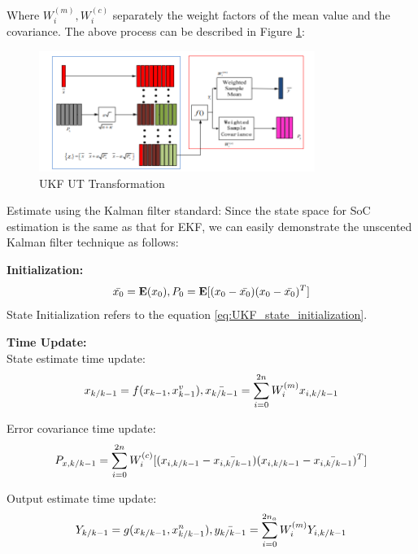 Where $W_i^{(m)}, W_i^{(c)}$ separately the weight factors of the mean value and the covariance.
The above process can be described in Figure \ref{fig:UKF_UT_Transformation}:
\begin{figure}[h]
	\centering
	\includegraphics[width=0.8\textwidth]{Chap07/Figures/UKF_UT.PNG}
	\caption{UKF UT Transformation }
	\label{fig:UKF_UT_Transformation}
\end{figure}
Estimate using the Kalman filter standard: Since the state space for SoC estimation is the same as that for EKF, we can easily demonstrate the unscented Kalman filter technique as follows:


\textbf{Initialization:}\\
\begin{equation} \label{eq:UKF_initialization}
    \bar{x_0} = \textbf{E}(x_0) , P_0 = \textbf{E}[(x_0 - \bar{x_0})(x_0 - \bar{x_0})^{T}] \\
\end{equation}  
State Initialization refers to the equation \ref{eq:UKF_state_initialization}.

\textbf{Time Update:}\\
State estimate time update:  \\
\begin{equation} \label{eq:UKF_State_estimate_time_update}
    x_{k/k-1} = f(x_{k-1},x_{k-1}^{v}), \bar{x_{k/k-1}} = \sum_{i = 0}^{2n} W_i^{(m)}x_{i,k/k-1} \\
\end{equation}  

Error covariance time update: \\
\begin{equation} \label{eq:UKF_Error_covariance_time_update}
    P_{x,k/k-1} = \sum_{i = 0}^{2n} W_i^{(c)}[(x_{i,k/k-1} - \bar{x_{i,k/k-1}})(x_{i,k/k-1} - \bar{x_{i,k/k-1}})^{T}] \\
\end{equation}  

Output estimate time update: \\
\begin{equation} \label{eq:UKF_Output_estimate_time_update}
    Y_{k/k-1}  = g(x_{k/k-1},x_{k/k-1}^{n}),  \bar{y_{k/k-1}}  = \sum_{i = 0}^{2n_a} W_i^{(m)}Y_{i,k/k-1}\\
\end{equation}  

